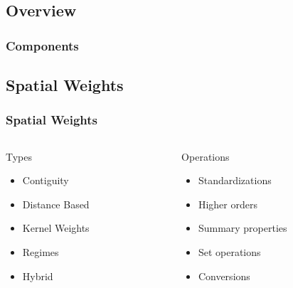 \documentclass{beamer}
\begin{document}
\subsection{Overview}


\begin{frame}\frametitle{Components}
\begin{center}
     \begin{figure}
      \end{figure}      
\end{center}
  
\end{frame}



\subsection{Spatial Weights}

\begin{frame}\frametitle{Spatial Weights}
  \begin{columns}
  \begin{column}[l]{5cm}
    \begin{block}{Types}
    \begin{itemize}
      \item Contiguity
      \item Distance Based
      \item Kernel Weights
      \item Regimes
      \item Hybrid
    \end{itemize}
  \end{block}
  \end{column}
  \begin{column}[r]{5cm}
    \begin{block}{Operations}
    \begin{itemize}
      \item Standardizations
       \item Higher orders
       \item Summary properties
       \item Set operations
       \item Conversions
    \end{itemize}
  \end{block}
  \end{column}
  \end{columns}
\end{frame}
\end{document}
